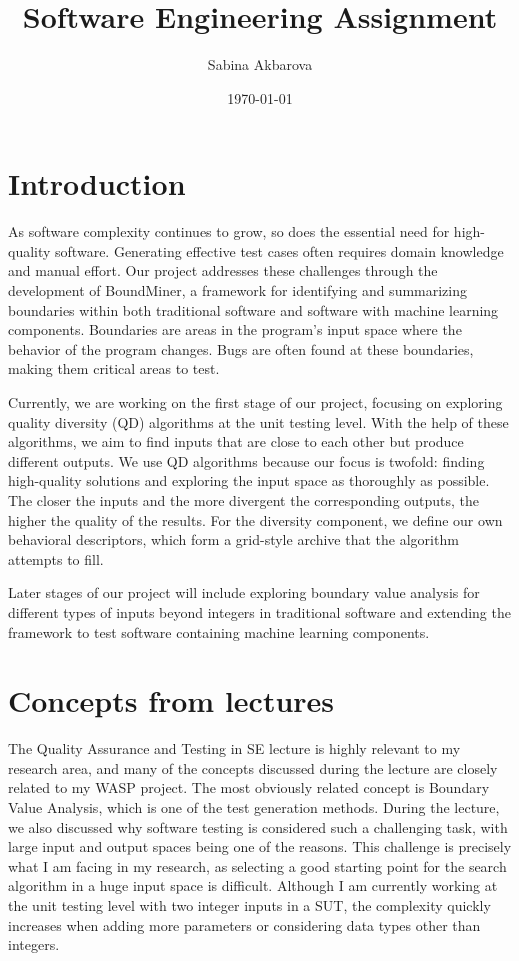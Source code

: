 \documentclass[11pt]{article}
\title{Software Engineering Assignment}
\author{Sabina Akbarova}
\affil{Chalmers University of Technology}
\date{\today}
\begin{document}
\maketitle

\section{Introduction}
As software complexity continues to grow, so does the essential need for high-quality software. Generating effective test cases often requires domain knowledge and manual effort. Our project addresses these challenges through the development of BoundMiner, a framework for identifying and summarizing boundaries within both traditional software and software with machine learning components. Boundaries are areas in the program’s input space where the behavior of the program changes. Bugs are often found at these boundaries, making them critical areas to test.

Currently, we are working on the first stage of our project, focusing on exploring quality diversity (QD) algorithms at the unit testing level. With the help of these algorithms, we aim to find inputs that are close to each other but produce different outputs. We use QD algorithms because our focus is twofold: finding high-quality solutions and exploring the input space as thoroughly as possible. The closer the inputs and the more divergent the corresponding outputs, the higher the quality of the results. For the diversity component, we define our own behavioral descriptors, which form a grid-style archive that the algorithm attempts to fill.

Later stages of our project will include exploring boundary value analysis for different types of inputs beyond integers in traditional software and extending the framework to test software containing machine learning components.

\section{Concepts from lectures}
The Quality Assurance and Testing in SE lecture is highly relevant to my research area, and many of the concepts discussed during the lecture are closely related to my WASP project. The most obviously related concept is Boundary Value Analysis, which is one of the test generation methods. During the lecture, we also discussed why software testing is considered such a challenging task, with large input and output spaces being one of the reasons. This challenge is precisely what I am facing in my research, as selecting a good starting point for the search algorithm in a huge input space is difficult. Although I am currently working at the unit testing level with two integer inputs in a SUT, the complexity quickly increases when adding more parameters or considering data types other than integers.
\end{document}
